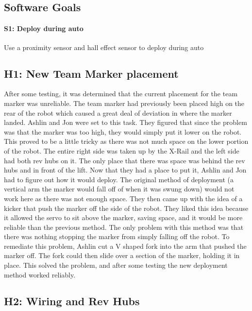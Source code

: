 \documentclass{article}
\begin{document}
\subsection{Software Goals}
\paragraph{S1: Deploy during auto}
 Use a proximity sensor and hall effect sensor to deploy during auto
\newpage
\subsection{H1: New Team Marker placement}

After some testing, it was determined that the current placement for the team marker was unreliable. The team marker had previously been placed high on the rear of the robot which caused a great deal of deviation in where the marker landed. Ashlin and Jon were set to this task. They figured that since the problem was that the marker was too high, they would simply put it lower on the robot. This proved to be a little tricky as there was not much space on the lower portion of the robot. The entire right side was taken up by the X-Rail and the left side had both rev hubs on it. The only place that there was space was behind the rev hubs and in front of the lift. Now that they had a place to put it, Ashlin and Jon had to figure out how it would deploy. The original method of deployment (a vertical arm the marker would fall off of when it was swung down) would not work here as there was not enough space. They then came up with the idea of a kicker that push the marker off the side of the robot. They liked this idea because it allowed the servo to sit above the marker, saving space, and it would be more reliable than the previous method. The only problem with this method was that there was nothing stopping the marker from simply falling off the robot. To remediate this problem, Ashlin cut a V shaped fork into the arm that pushed the marker off. The fork could then slide over a section of the marker, holding it in place. This solved the problem, and after some testing the new deployment method worked reliably. 

\subsection{H2: Wiring and Rev Hubs}
\end{document}
